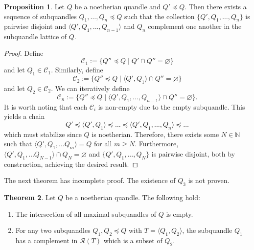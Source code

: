 \documentclass[reqno,dvipsnames]{amsart}
\let\mc\mathcal
\newcommand{\la}{\langle}
\newcommand{\ra}{\rangle}
\theoremstyle{definition}
\newtheorem{theorem}{Theorem}[section]
\newtheorem{proposition}[theorem]{Proposition}
\begin{document}
{\begin{proposition}
    Let $Q$ be a noetherian quandle and $Q' \preceq Q.$ Then there exists a sequence of subquandles $Q_1,\dots ,Q_n \preceq Q$ such that the collection $\{Q',Q_1,\dots,Q_n\}$ is pairwise disjoint and $\la Q',Q_1,...,Q_{n-1}\ra$ and $Q_n$ complement one another in the subquandle lattice of $Q.$
\end{proposition}

\begin{proof}
    Define 
    \[\mathcal{C}_1 := \{Q'' \preceq Q \mid Q' \cap Q'' = \varnothing\}\] and let $Q_1 \in \mathcal{C}_1.$ Similarly, define 
    \[\mathcal{C}_2 := \{Q'' \preceq Q \mid \la Q', Q_1\ra \cap Q'' = \varnothing\}\] and let $Q_2 \in \mathcal{C}_2.$ We can iteratively define 
    \[\mathcal{C}_n := \{Q'' \preceq Q \mid \la Q', Q_1,...,Q_{n-1}\ra \cap Q'' = \varnothing\}.\]
    It is worth noting that each $\mathcal{C}_i$ is non-empty due to the empty subquandle. This yields a chain \[Q' \preceq \la Q', Q_1\ra \preceq \dots \preceq \la Q', Q_1,...,Q_n\ra \preceq \dots\]
    which must stabilize since $Q$ is noetherian. Therefore, there exists some $N \in \mathbb{N}$ such that $\la Q', Q_1, \dots Q_m\ra = Q$ for all $m \geq N.$ Furthermore, $\la Q', Q_1, \dots Q_{N-1}\ra \cap Q_N = \varnothing$ and $\{Q',Q_1,...,Q_N\}$ is pairwise disjoint, both by construction, achieving the desired result.
\end{proof}

The next theorem has incomplete proof. The existence of $Q_3$ is not proven.

\begin{theorem}
Let $Q$ be a noetherian quandle. The following hold:
\begin{enumerate}
    \item The intersection of all maximal subquandles of $Q$ is empty.
    \item For any two subquandles $Q_1,Q_2\preccurlyeq Q$ with $T=\la Q_1,Q_2\ra$, the subquandle $Q_1$ has a complement in $\mc{R}(T)$ which is a subset of $Q_2$.
\end{enumerate}
\end{theorem}

}
\end{document}
